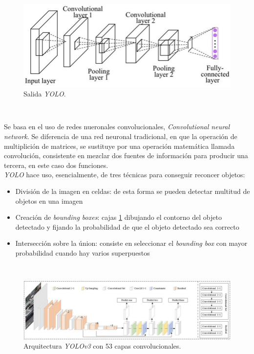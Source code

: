 \begin{figure} [h!]
	\begin{center}
		\includegraphics[width=12cm]{figs/yolo}
	\end{center}
	\caption{Salida \textit{YOLO}.}
	\label{fig:yolo}
\end{figure}\

Se basa en el uso de redes nueronales convolucionales, \textit{Convolutional neural network}. Se diferencia de una red neuronal tradicional, en que la operación de multiplición de matrices, se sustituye por una operación matemática llamada convolución, consistente en mezclar dos fuentes de información para producir una tercera, en este caso dos funciones.\\


\textit{YOLO} hace uso, esencialmente, de tres técnicas para conseguir reconcer objetos:
\begin{itemize}
	\item División de la imagen en celdas: de esta forma se pueden detectar multitud de objetos en una imagen
	\item Creación de \textit{bounding boxes}: cajas \ref{fig:yolo} dibujando el contorno del objeto detectado y fijando la probabilidad de que el objeto detectado sea correcto
	\item Intersección sobre la únion: consiste en seleccionar el \textit{bounding box} con mayor probabilidad cuando hay varios superpuestos
\end{itemize}\


\begin{figure} [h!]
	\begin{center}
		\includegraphics[width=16cm]{figs/yolov353}
	\end{center}
	\caption{Arquitectura \textit{YOLOv3} con 53 capas convolucionales.}
	\label{fig:yololayers}
\end{figure}\

